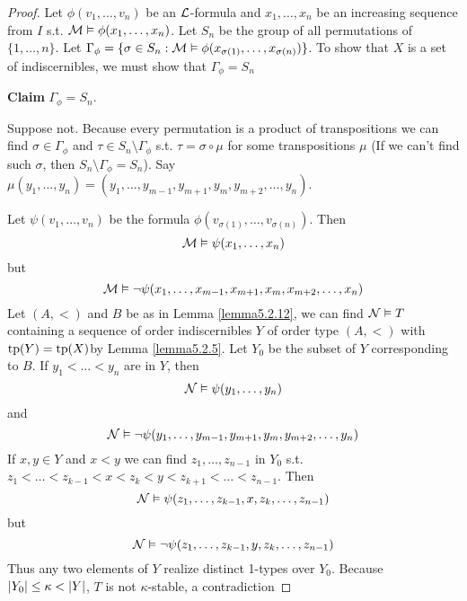 \documentclass[11pt]{article}
\begin{document}
\begin{proof}
Let \(\phi(v_1,\dots,v_n)\) be an \(\mathcal{L}\)-formula and \(x_1,\dots,x_n\) be an increasing sequence from \(I\)
s.t. \(\mathcal{M}\vDash\phi(x_1,\dots,x_n)\). Let \(S_n\) be the group of all permutations of \(\{1,\dots,n\}\).
Let \(\Gamma_\phi=\{\sigma\in  S_n:\mathcal{M}\vDash\phi(x_{\sigma(1)},\dots,x_{\sigma(n)})\}\). To show that \(X\) is a set of indiscernibles, we
must show that \(\Gamma_\phi=S_n\)

\textbf{Claim} \(\Gamma_\phi=S_n\).

Suppose not. Because every permutation is a product of transpositions we can find \(\sigma\in\Gamma_\phi\)
and \(\tau\in S_n\setminus\Gamma_\phi\) s.t. \(\tau=\sigma\circ\mu\) for some transpositions \(\mu\) (If we can't find such \(\sigma\), then \(S_n\setminus\Gamma_\phi=S_n\)). Say
\(\mu(y_1,\dots,y_n)=(y_1,\dots,y_{m-1},y_{m+1},y_m,y_{m+2},\dots,y_n)\).

Let \(\psi(v_1,\dots,v_n)\) be the formula \(\phi(v_{\sigma(1)},\dots,v_{\sigma(n)})\). Then
\begin{equation*}
\mathcal{M}\vDash\psi(x_1,\dots,x_n)
\end{equation*}
but
\begin{equation*}
\mathcal{M}\vDash\neg\psi(x_1,\dots,x_{m-1},x_{m+1},x_m,x_{m+2},\dots,x_n)
\end{equation*}
Let \((A,<)\) and \(B\) be as in Lemma \ref{lemma5.2.12}, we can find \(\mathcal{N}\vDash T\)  containing a
sequence of order indiscernibles \(Y\) of order type \((A,<)\)
with \(\operatorname{tp}(Y)=\operatorname{tp}(X)\)by Lemma \ref{lemma5.2.5}.
Let \(Y_0\) be the subset of \(Y\) corresponding to \(B\). If \(y_1<\dots<y_n\) are in \(Y\), then
\begin{equation*}
\mathcal{N}\vDash\psi(y_1,\dots,y_n)
\end{equation*}
and
\begin{equation*}
\mathcal{N}\vDash\neg\psi(y_1,\dots,y_{m-1},y_{m+1},y_m,y_{m+2},\dots,y_n)
\end{equation*}
If \(x,y\in Y\) and \(x<y\) we can find \(z_1,\dots,z_{n-1}\) in \(Y_0\)
s.t. \(z_1<\dots<z_{k-1}<x<z_k<y<z_{k+1}<\dots<z_{n-1}\). Then
\begin{equation*}
\mathcal{N}\vDash\psi(z_1,\dots,z_{k-1},x,z_k,\dots,z_{n-1})
\end{equation*}
but
\begin{equation*}
\mathcal{N}\vDash\neg\psi(z_1,\dots,z_{k-1},y,z_k,\dots,z_{n-1})
\end{equation*}
Thus any two elements of \(Y\) realize distinct 1-types over \(Y_0\).
Because \(\abs{Y_0}\le\kappa<\abs{Y}\), \(T\) is not \(\kappa\)-stable, a contradiction
\end{proof}
\end{document}
